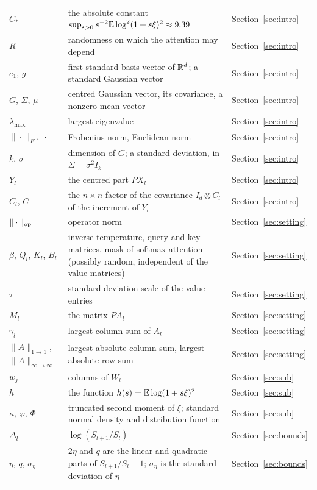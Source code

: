 {\begin{center}
\begin{tabular}{@{}p{}p{}l@{}}
$C_*$ & the absolute constant $\sup_{s>0}s^{-2}\mathbb{E}\log^2(1+s\xi)^2\approx9.39$ & Section~\ref{sec:intro} \\
$R$ & randomness on which the attention may depend & Section~\ref{sec:intro} \\
$e_1$, $g$ & first standard basis vector of $\mathbb{R}^d$; a standard Gaussian vector & Section~\ref{sec:intro} \\
$G$, $\Sigma$, $\mu$ & centred Gaussian vector, its covariance, a nonzero mean vector & Section~\ref{sec:intro} \\
$\lambda_{\max}$ & largest eigenvalue & Section~\ref{sec:intro} \\
$\|\cdot\|_F$, $|\cdot|$ & Frobenius norm, Euclidean norm & Section~\ref{sec:intro} \\
$k$, $\sigma$ & dimension of $G$; a standard deviation, in $\Sigma=\sigma^2I_k$ & Section~\ref{sec:intro} \\
$Y_l$ & the centred part $PX_l$ & Section~\ref{sec:intro} \\
$C_l$, $C$ & the $n\times n$ factor of the covariance $I_d\otimes C_l$ of the increment of $Y_l$ & Section~\ref{sec:intro} \\
$\|\cdot\|_{\mathrm{op}}$ & operator norm & Section~\ref{sec:setting} \\
$\beta$, $Q_l$, $K_l$, $B_l$ & inverse temperature, query and key matrices, mask of softmax attention (possibly random, independent of the value matrices) & Section~\ref{sec:setting} \\
$\tau$ & standard deviation scale of the value entries & Section~\ref{sec:setting} \\
$M_l$ & the matrix $PA_l$ & Section~\ref{sec:setting} \\
$\gamma_l$ & largest column sum of $A_l$ & Section~\ref{sec:setting} \\
$\|A\|_{1\to1}$, $\|A\|_{\infty\to\infty}$ & largest absolute column sum, largest absolute row sum & Section~\ref{sec:setting} \\
$w_j$ & columns of $W_l$ & Section~\ref{sec:sub} \\
$h$ & the function $h(s)=\mathbb{E}\log(1+s\xi)^2$ & Section~\ref{sec:sub} \\
$\kappa$, $\varphi$, $\Phi$ & truncated second moment of $\xi$; standard normal density and distribution function & Section~\ref{sec:sub} \\
$\Delta_l$ & $\log(S_{l+1}/S_l)$ & Section~\ref{sec:bounds} \\
$\eta$, $q$, $\sigma_\eta$ & $2\eta$ and $q$ are the linear and quadratic parts of $S_{l+1}/S_l-1$; $\sigma_\eta$ is the standard deviation of $\eta$ & Section~\ref{sec:bounds} \\

\end{tabular}
\end{center}}
